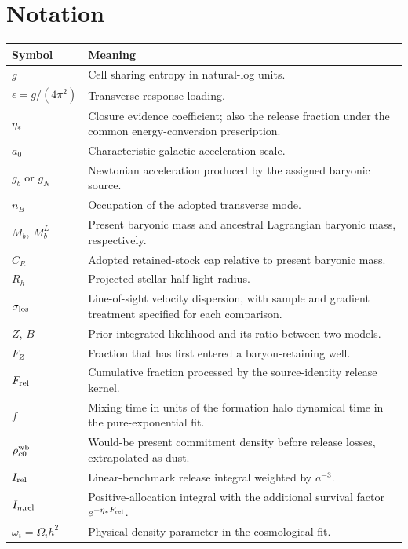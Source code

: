 \section{Notation}
\small
\begin{tabularx}{\textwidth}{P{.23\textwidth}Y}
\toprule Symbol & Meaning \\
\midrule
$g$ & Cell sharing entropy in natural-log units. \\
$\epsilon=g/(4\pi^2)$ & Transverse response loading. \\
$\eta_*$ & Closure evidence coefficient; also the release fraction under
the common energy-conversion prescription. \\
$a_0$ & Characteristic galactic acceleration scale. \\
$g_b$ or $g_N$ & Newtonian acceleration produced by the assigned baryonic
source. \\
$n_B$ & Occupation of the adopted transverse mode. \\
$M_b$, $M_b^L$ & Present baryonic mass and ancestral Lagrangian baryonic
mass, respectively. \\
$C_R$ & Adopted retained-stock cap relative to present baryonic mass. \\
$R_h$ & Projected stellar half-light radius. \\
$\sigma_{\rm los}$ & Line-of-sight velocity dispersion, with sample and
gradient treatment specified for each comparison. \\
$Z$, $B$ & Prior-integrated likelihood and its ratio between two models. \\
$F_Z$ & Fraction that has first entered a baryon-retaining well. \\
$F_{\rm rel}$ & Cumulative fraction processed by the source-identity
release kernel. \\
$f$ & Mixing time in units of the formation halo dynamical time in the
pure-exponential fit. \\
$\rho_{c0}^{\rm wb}$ & Would-be present commitment density before release
losses, extrapolated as dust. \\
$I_{\rm rel}$ & Linear-benchmark release integral weighted by $a^{-3}$. \\
$I_{\eta,\rm rel}$ & Positive-allocation integral with the additional
survival factor $e^{-\eta_*F_{\rm rel}}$. \\
$\omega_i=\Omega_i h^2$ & Physical density parameter in the cosmological
fit. \\
\bottomrule
\end{tabularx}
\normalsize
